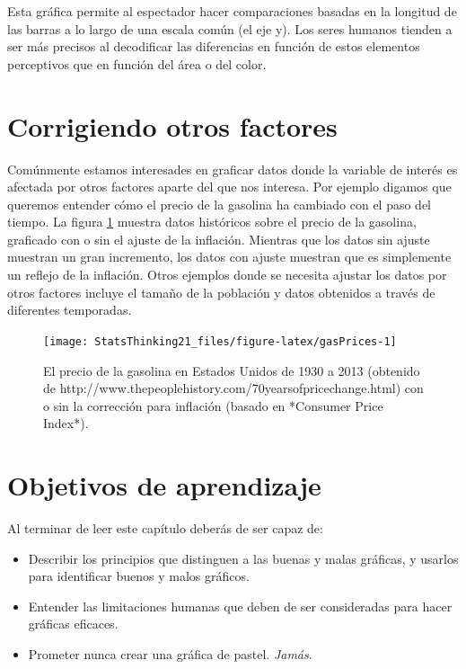 \documentclass[
  12pt,
]{book}
\providecommand{\tightlist}{%
  \setlength{\itemsep}{0pt}\setlength{\parskip}{0pt}}
\begin{document}
Esta gráfica permite al espectador hacer comparaciones basadas en la longitud de las barras a lo largo de una escala común (el eje y). Los seres humanos tienden a ser más precisos al decodificar las diferencias en función de estos elementos perceptivos que en función del área o del color.

\hypertarget{corrigiendo-otros-factores}{%
\section{Corrigiendo otros factores}\label{corrigiendo-otros-factores}}

Comúnmente estamos interesades en graficar datos donde la variable de interés es afectada por otros factores aparte del que nos interesa. Por ejemplo digamos que queremos entender cómo el precio de la gasolina ha cambiado con el paso del tiempo. La figura \ref{fig:gasPrices} muestra datos históricos sobre el precio de la gasolina, graficado con o sin el ajuste de la inflación. Mientras que los datos sin ajuste muestran un gran incremento, los datos con ajuste muestran que es simplemente un reflejo de la inflación. Otros ejemplos donde se necesita ajustar los datos por otros factores incluye el tamaño de la población y datos obtenidos a través de diferentes temporadas.

\begin{figure}
\texttt{[image: StatsThinking21\_files/figure-latex/gasPrices-1]} \caption{El precio de la gasolina en Estados Unidos de 1930 a 2013 (obtenido de http://www.thepeoplehistory.com/70yearsofpricechange.html) con o sin la corrección para inflación (basado en *Consumer Price Index*).}\label{fig:gasPrices}
\end{figure}

\hypertarget{objetivos-de-aprendizaje}{%
\section{Objetivos de aprendizaje}\label{objetivos-de-aprendizaje}}

Al terminar de leer este capítulo deberás de ser capaz de:

\begin{itemize}
\tightlist
\item
  Describir los principios que distinguen a las buenas y malas gráficas, y usarlos para identificar buenos y malos gráficos.
\item
  Entender las limitaciones humanas que deben de ser consideradas para hacer gráficas eficaces.
\item
  Prometer nunca crear una gráfica de pastel. \emph{Jamás}.
\end{itemize}
\end{document}
